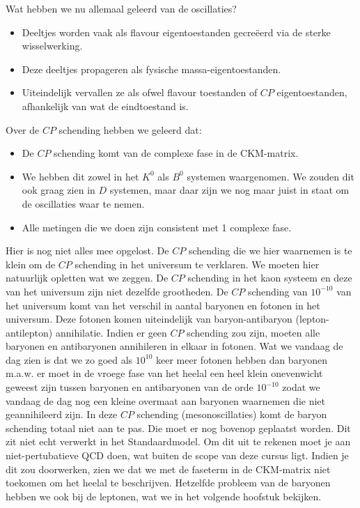 \documentclass[../main.tex]{subfiles}
\begin{document}
Wat hebben we nu allemaal geleerd van de oscillaties?
\begin{itemize}
    \item Deeltjes worden vaak als flavour eigentoestanden gecreëerd via de sterke wisselwerking.
    \item Deze deeltjes propageren als fysische massa-eigentoestanden.
    \item Uiteindelijk vervallen ze als ofwel flavour toestanden of $CP$ eigentoestanden, afhankelijk van wat de eindtoestand is.
\end{itemize}
Over de $CP$ schending hebben we geleerd dat:
\begin{itemize}
    \item De $CP$ schending komt van de complexe fase in de CKM-matrix.
    \item We hebben dit zowel in het $K^0$ als $B^0$ systemen waargenomen. We zouden dit ook graag zien in $D$ systemen, maar daar zijn we nog maar juist in staat om de oscillaties waar te nemen.
    \item Alle metingen die we doen zijn consistent met 1 complexe fase.
\end{itemize}
Hier is nog niet alles mee opgelost. De $CP$ schending die we hier waarnemen is te klein om de $CP$ schending in het universum te verklaren. We moeten hier natuurlijk opletten wat we zeggen. De $CP$ schending in het kaon systeem en deze van het universum zijn niet dezelfde grootheden. De $CP$ schending van $10^{-10}$ van het universum komt van het verschil in aantal baryonen en fotonen in het universum. Deze fotonen komen uiteindelijk van baryon-antibaryon (lepton-antilepton) annihilatie. Indien er geen $CP$ schending zou zijn, moeten alle baryonen en antibaryonen annihileren in elkaar in fotonen. Wat we vandaag de dag zien is dat we zo goed als $10^{10}$ keer meer fotonen hebben dan baryonen m.a.w. er moet in de vroege fase van het heelal een heel klein onevenwicht geweest zijn tussen baryonen en antibaryonen van de orde $10^{-10}$ zodat we vandaag de dag nog een kleine overmaat aan baryonen waarnemen die niet geannihileerd zijn. In deze $CP$ schending (mesonoscillaties) komt de baryon schending totaal niet aan te pas. Die moet er nog bovenop geplaatst worden. Dit zit niet echt verwerkt in het Standaardmodel. Om dit uit te rekenen moet je aan niet-pertubatieve QCD doen, wat buiten de scope van deze cursus ligt. Indien je dit zou doorwerken, zien we dat we met de faseterm in de CKM-matrix niet toekomen om het heelal te beschrijven. Hetzelfde probleem van de baryonen hebben we ook bij de leptonen, wat we in het volgende hoofstuk bekijken.
\end{document}
